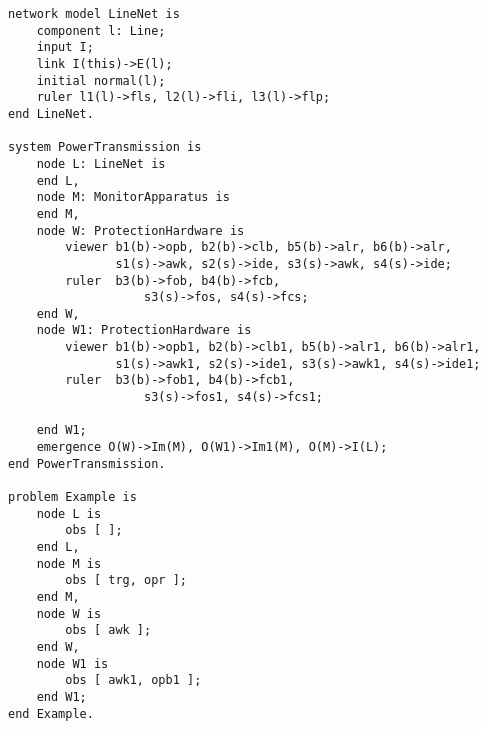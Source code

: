 \begin{verbatim}
network model LineNet is
	component l: Line;
	input I;
	link I(this)->E(l);
	initial normal(l);
	ruler l1(l)->fls, l2(l)->fli, l3(l)->flp;
end LineNet.

system PowerTransmission is
	node L: LineNet is
	end L,
	node M: MonitorApparatus is
	end M,
	node W: ProtectionHardware is
		viewer b1(b)->opb, b2(b)->clb, b5(b)->alr, b6(b)->alr,
		       s1(s)->awk, s2(s)->ide, s3(s)->awk, s4(s)->ide;
		ruler  b3(b)->fob, b4(b)->fcb,
	               s3(s)->fos, s4(s)->fcs;
	end W,
	node W1: ProtectionHardware is
		viewer b1(b)->opb1, b2(b)->clb1, b5(b)->alr1, b6(b)->alr1,
		       s1(s)->awk1, s2(s)->ide1, s3(s)->awk1, s4(s)->ide1;
		ruler  b3(b)->fob1, b4(b)->fcb1,
	               s3(s)->fos1, s4(s)->fcs1;

	end W1;
	emergence O(W)->Im(M), O(W1)->Im1(M), O(M)->I(L);
end PowerTransmission.

problem Example is
	node L is
		obs [ ];
	end L,
	node M is
		obs [ trg, opr ];
	end M,
	node W is
		obs [ awk ];
	end W,
	node W1 is
		obs [ awk1, opb1 ];
	end W1;
end Example.
\end{verbatim}